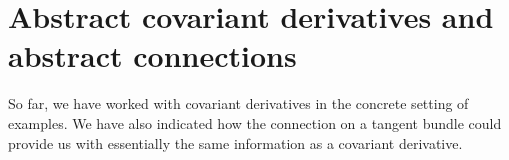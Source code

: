 \documentclass[11pt,a4paper,twoside,openany]{report}
\theoremstyle{my-theorem}
\theoremstyle{non-theorem}
\newtheorem{note}[theorem]{Note}
\renewenvironment{proof}[1][\proofname]{{\scshape #1. }}{\qed}
\begin{document}
%			
%					
%					
%			
	
	
	\chapter{Abstract covariant derivatives and abstract connections}
	\label{chap:abstract-covariant-derivatives-and-abstract-connections}
		
		So far, we have worked with covariant derivatives in the concrete setting of examples. We have also indicated how the connection on a tangent bundle could provide us with essentially the same information as a covariant derivative.
		
\end{document}
